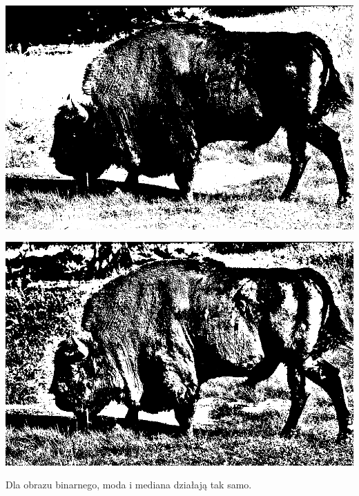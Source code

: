 \documentclass{article}
\begin{document}
	\begin{center}
		\includegraphics[width=\linewidth]{../../lab03/bison_bin_otsu.png}
	\end{center}
	\begin{center}
		\includegraphics[width=\linewidth]{../../lab03/bison_bin_adaptive.png}
	\end{center}
	Dla obrazu binarnego, moda i mediana działają tak samo.
\end{document}
